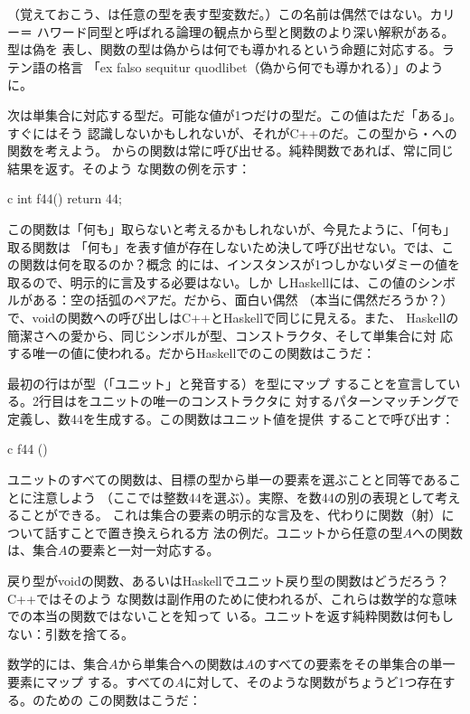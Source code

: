 （覚えておこう、は任意の型を表す型変数だ。）この名前は偶然ではない。カリー＝
ハワード同型と呼ばれる論理の観点から型と関数のより深い解釈がある。型は偽を
表し、関数の型は偽からは何でも導かれるという命題に対応する。ラテン語の格言
「ex falso sequitur quodlibet（偽から何でも導かれる）」のように。

次は単集合に対応する型だ。可能な値が1つだけの型だ。この値はただ「ある」。すぐにはそう
認識しないかもしれないが、それがC++のだ。この型から・への関数を考えよう。
からの関数は常に呼び出せる。純粋関数であれば、常に同じ結果を返す。そのよう
な関数の例を示す：

\begin{snip}{c}
int f44() { return 44; }
\end{snip}
この関数は「何も」取らないと考えるかもしれないが、今見たように、「何も」取る関数は
「何も」を表す値が存在しないため決して呼び出せない。では、この関数は何を取るのか？概念
的には、インスタンスが1つしかないダミーの値を取るので、明示的に言及する必要はない。しか
しHaskellには、この値のシンボルがある：空の括弧のペア\code{()}だ。だから、面白い偶然
（本当に偶然だろうか？）で、voidの関数への呼び出しはC++とHaskellで同じに見える。また、
Haskellの簡潔さへの愛から、同じシンボル\code{()}が型、コンストラクタ、そして単集合に対
応する唯一の値に使われる。だからHaskellでのこの関数はこうだ：

最初の行はが型\code{()}（「ユニット」と発音する）を型にマップ
することを宣言している。2行目はをユニットの唯一のコンストラクタ\code{()}に
対するパターンマッチングで定義し、数44を生成する。この関数はユニット値\code{()}を提供
することで呼び出す：

\begin{snip}{c}
f44 ()
\end{snip}
ユニットのすべての関数は、目標の型から単一の要素を選ぶことと同等であることに注意しよう
（ここでは整数44を選ぶ）。実際、を数44の別の表現として考えることができる。
これは集合の要素の明示的な言及を、代わりに関数（射）について話すことで置き換えられる方
法の例だ。ユニットから任意の型$A$への関数は、集合$A$の要素と一対一対応する。

戻り型がvoidの関数、あるいはHaskellでユニット戻り型の関数はどうだろう？C++ではそのよう
な関数は副作用のために使われるが、これらは数学的な意味での本当の関数ではないことを知って
いる。ユニットを返す純粋関数は何もしない：引数を捨てる。

数学的には、集合$A$から単集合への関数は$A$のすべての要素をその単集合の単一要素にマップ
する。すべての$A$に対して、そのような関数がちょうど1つ存在する。のための
この関数はこうだ：

